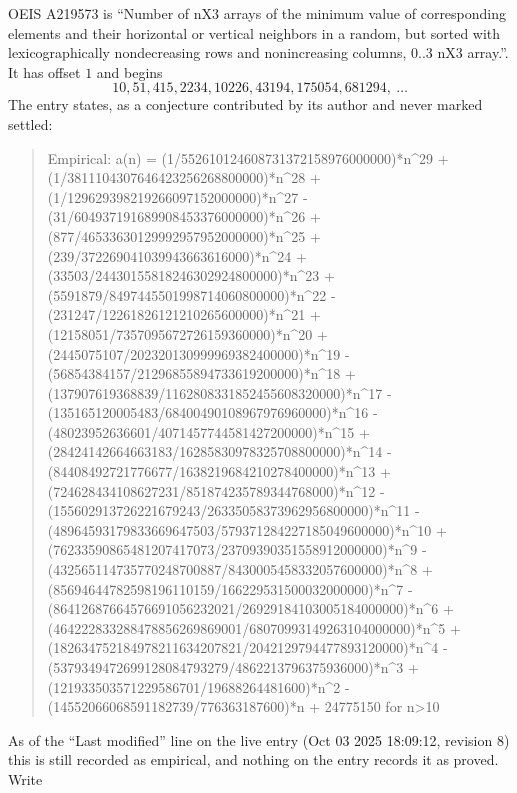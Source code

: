 \documentclass[11pt,a4paper]{article}
\theoremstyle{plain}
\theoremstyle{definition}
\begin{document}
OEIS A219573 is ``Number of nX3 arrays of the minimum value of corresponding elements and their horizontal or vertical neighbors in a random, but sorted with lexicographically nondecreasing rows and nonincreasing columns, 0..3 nX3 array.''. It has offset $1$ and begins
\[
10, 51, 415, 2234, 10226, 43194, 175054, 681294,\ \dots
\]
The entry states, as a conjecture contributed by its author and never marked settled:
\begin{quote}\raggedright\small
Empirical: a(n) = (1/552610124608731372158976000000)*n\^{}29 + (1/3811104307646423256268800000)*n\^{}28 + (1/129629398219266097152000000)*n\^{}27 - (31/604937191689908453376000000)*n\^{}26 + (877/46533630129992957952000000)*n\^{}25 + (239/372269041039943663616000)*n\^{}24 + (33503/24430155818246302924800000)*n\^{}23 + (5591879/8497445501998714060800000)*n\^{}22 - (231247/12261826121210265600000)*n\^{}21 + (12158051/7357095672726159360000)*n\^{}20 + (2445075107/202320130999969382400000)*n\^{}19 - (56854384157/21296855894733619200000)*n\^{}18 + (137907619368839/1162808331852455608320000)*n\^{}17 - (135165120005483/68400490108967976960000)*n\^{}16 - (48023952636601/4071457744581427200000)*n\^{}15 + (28424142664663183/16285830978325708800000)*n\^{}14 - (84408492721776677/1638219684210278400000)*n\^{}13 + (724628434108627231/851874235789344768000)*n\^{}12 - (155602913726221679243/26335058373962956800000)*n\^{}11 - (48964593179833669647503/579371284227185049600000)*n\^{}10 + (76233590865481207417073/23709390351558912000000)*n\^{}9 - (432565114735770248700887/8430005458332057600000)*n\^{}8 + (85694644782598196110159/166229531500032000000)*n\^{}7 - (86412687664576691056232021/26929184103005184000000)*n\^{}6 + (464222833288478856269869001/68070993149263104000000)*n\^{}5 + (182634752184978211634207821/2042129794477893120000)*n\^{}4 - (5379349472699128084793279/4862213796375936000)*n\^{}3 + (121933503571229586701/19688264481600)*n\^{}2 - (14552066068591182739/776363187600)*n + 24775150 for n>10
\end{quote}
As of the ``Last modified'' line on the live entry (Oct 03 2025 18:09:12, revision 8) this is still
recorded as empirical, and nothing on the entry records it as proved. Write
\end{document}
